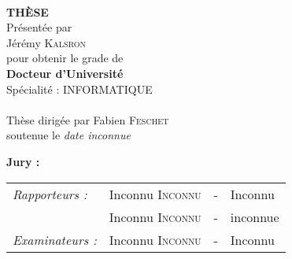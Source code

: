 

\begin{titlepage}
\begin{center}
 \\
\vspace*{0.1cm}
\vspace*{0.1cm}
\vspace*{0.1cm}

\vspace*{0.5cm}
\noindent \Huge \textbf{THÈSE} \\
\vspace*{0.3cm}
\noindent \large {Présentée par\\}
\noindent \LARGE Jérémy \textsc{Kalsron} \\
\vspace*{0.8cm}
\noindent \large {pour obtenir le grade de} \\
\noindent \LARGE \textbf{Docteur d'Université} \\
\vspace*{0.3cm}
\noindent \large {Spécialité : INFORMATIQUE} \\
\vspace*{0.8cm}
 \\
\vspace*{0.8cm}
\noindent \Large Thèse dirigée par Fabien \textsc{Feschet} \\
\vspace*{0.2cm}
\noindent \large soutenue le \textit{date inconnue} \\
\vspace*{0.2cm}
\end{center}
\noindent \large \textbf{Jury :} \\
\begin{center}
\noindent \large 
\begin{tabular}{llcl}
      \textit{Rapporteurs :}	& Inconnu \textsc{Inconnu}		& - & Inconnu \\
                              & Inconnu \textsc{Inconnu}		& - & inconnue \\
      \textit{Examinateurs :} & Inconnu \textsc{Inconnu}		& - & Inconnu \\

\end{tabular}
\end{center}
\end{titlepage}
